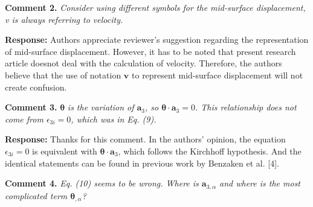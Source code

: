 \documentclass{article}
\begin{document}
\textbf{Comment 2.} \textit{Consider using different symbols for the mid-surface displacement, v is always referring to velocity.}

\textbf{Response:} Authors appreciate reviewer's suggestion regarding the representation of mid-surface displacement. However, it has to be noted that present research article doesnot deal with the calculation of velocity. Therefore, the authors believe that the use of notation $\boldsymbol v$ to represent mid-surface displacement will not create confusion. 

\textbf{Comment 3.} $\boldsymbol \theta$ \textit{is the variation of $\boldsymbol a_3$, so $\boldsymbol \theta \cdot \boldsymbol a_3=0$. This relationship does not come from $\epsilon_{3i} = 0$, which was in Eq. (9).}

\textbf{Response:} Thanks for this comment. In the authors' opinion, the equation $\epsilon_{3i}=0$ is equivalent with $\boldsymbol \theta \cdot \boldsymbol a_3$, which follows the Kirchhoff hypothesis. And the identical statements can be found in previous work by Benzaken et al. [4]. 

\textbf{Comment 4.} \textit{Eq. (10) seems to be wrong. Where is $\boldsymbol a_{3,\alpha}$ and where is the most complicated term $\boldsymbol \theta_{,\alpha}$?}
\end{document}
